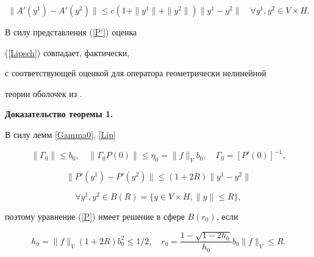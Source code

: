 \begin{lem} 


\label{Lip}


\begin{equation}


\label{Lipsch}


\| A'(y^1) - A'( y^2) \|


\le c ( 1 + \| y^1 \| + \| y^2 \|


) \| y^1 - y^2 \|


\quad \forall y^1, y^2 \in V \times H.


\end{equation}


\end{lem} 





\begin{pf} В силу представления (\ref{P'}) оценка 


(\ref{Lipsch}) совпадает, фактически, 


с соответствующей оценкой для оператора геометрически нелинейной 


теории оболочек из \cite{Kar1}.\end{pf}





{\bf Доказательство теоремы 1.}


В силу лемм \ref{Gamma0}, \ref{Lip}


$$


\| \Gamma_0 \| \le b_0 ,\quad


\|\Gamma_0 P(0)\| \le \eta_0


 = \|f\|_V b_0, \quad


\Gamma_0 = [ P'(0) ]^{-1},


$$


$$


\|P'(y^1) - P'(y^2)\| \le (1 + 2R) \| y^1 - y^2 \|


$$


$$


\forall


 y^1, y^2 \in B(R) = \{ y \in V \times H


, \| y \| \le R \},


$$


поэтому уравнение (\ref{P}) имеет решение в сфере $B(r_0)$, если 


\begin{equation}


\label{Kant1}


h_0 = \|f\|_V (1 + 2R)b_0^2 \le 1/2 ,\quad


r_0 = \frac {1 - \sqrt {1-2h_0}}{h_0} b_0 \|f\| _V \le R.


\end{equation}


